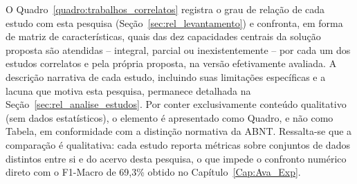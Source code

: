 O Quadro~\ref{quadro:trabalhos_correlatos} registra o grau de relação de cada estudo com esta pesquisa (Seção~\ref{sec:rel_levantamento}) e confronta, em forma de matriz de características, quais das dez capacidades centrais da solução proposta são atendidas -- integral, parcial ou inexistentemente -- por cada um dos estudos correlatos e pela própria proposta, na versão efetivamente avaliada. A descrição narrativa de cada estudo, incluindo suas limitações específicas e a lacuna que motiva esta pesquisa, permanece detalhada na Seção~\ref{sec:rel_analise_estudos}. Por conter exclusivamente conteúdo qualitativo (sem dados estatísticos), o elemento é apresentado como Quadro, e não como Tabela, em conformidade com a distinção normativa da ABNT. Ressalta-se que a comparação é qualitativa: cada estudo reporta métricas sobre conjuntos de dados distintos entre si e do acervo desta pesquisa, o que impede o confronto numérico direto com o F1-Macro de 69,3\% obtido no Capítulo~\ref{Cap:Ava_Exp}.

